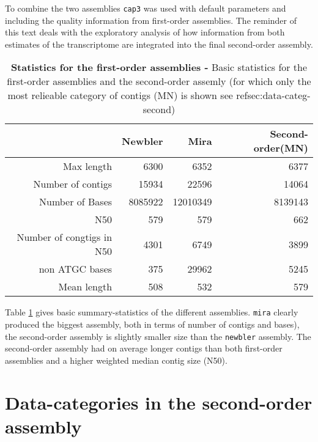 To combine the two assemblies \texttt{cap3} was used with default
parameters and including the quality information from first-order
assemblies. The reminder of this text deals with the exploratory
analysis of how information from both estimates of the transcriptome
are integrated into the final second-order assembly.

\begin{table}[ht]
\begin{center}
\begin{tabular}{rrrr}
  \hline
 & Newbler & Mira & Second-order(MN) \\ 
  \hline
Max length & 6300 & 6352 & 6377 \\ 
  Number of contigs & 15934 & 22596 & 14064 \\ 
  Number of Bases & 8085922 & 12010349 & 8139143 \\ 
  N50 & 579 & 579 & 662 \\ 
  Number of congtigs in N50 & 4301 & 6749 & 3899 \\ 
  non ATGC bases & 375 & 29962 & 5245 \\ 
  Mean length & 508 & 532 & 579 \\ 
   \hline
\end{tabular}
\caption[Statistics for the first-order assemblies]{\textbf{Statistics
    for the first-order assemblies -} Basic statistics for the
  first-order assemblies and the second-order assemly (for which only
  the most relieable category of contigs (MN) is shown see
  ref{sec:data-categ-second})}
\label{tab:pc}
\end{center}
\end{table}


Table \ref{tab:pc} gives basic summary-statistics of the different
assemblies. \texttt{mira} clearly produced the biggest assembly, both
in terms of number of contigs and bases), the second-order assembly is
slightly smaller size than the \texttt{newbler} assembly.  The
second-order assembly had on average longer contigs than both
first-order assemblies and a higher weighted median contig size (N50).

\section{Data-categories in the second-order assembly}
\label{sec:data-categ-second}


